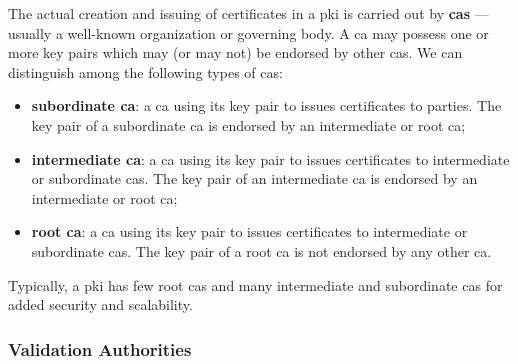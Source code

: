 The actual creation and issuing of certificates in a \gls{pki} is carried out by \textbf{\glspl{ca}} --- usually a well-known organization or governing body. A \gls{ca} may possess one or more key pairs which may (or may not) be endorsed by other \glspl{ca}. We can distinguish among the following types of \glspl{ca}:

\begin{itemize}
	\item \textbf{subordinate \gls{ca}}: a \gls{ca} using its key pair to issues certificates to parties. The key pair of a subordinate \gls{ca} is endorsed by an intermediate or root \gls{ca};
	\item \textbf{intermediate \gls{ca}}: a \gls{ca} using its key pair to issues certificates to intermediate or subordinate \glspl{ca}. The key pair of an intermediate \gls{ca} is endorsed by an intermediate or root \gls{ca};
	\item \textbf{root \gls{ca}}: a \gls{ca} using its key pair to issues certificates to intermediate or subordinate \glspl{ca}. The key pair of a root \gls{ca} is not endorsed by any other \gls{ca}.
\end{itemize}


Typically, a \gls{pki} has few root \glspl{ca} and many intermediate and subordinate \glspl{ca} for added security and scalability.

	
\subsubsection{Validation Authorities}\label{sec:binding_keys_to_parties:pki:va}

